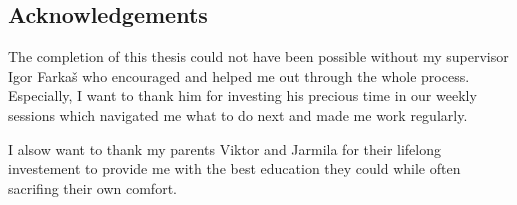 
\null 
\vfill 

\subsection*{Acknowledgements}

The completion of this thesis could not have been possible without my supervisor Igor Farkaš who encouraged and helped me out through the whole process. Especially, I want to thank him for investing his precious time in our weekly sessions which navigated me what to do next and made me work regularly. 

I alsow want to thank my parents Viktor and Jarmila for their lifelong investement to provide me with the best education they could while often sacrifing their own comfort. 
